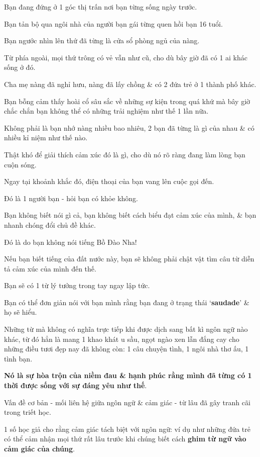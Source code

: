 \documentclass{article}
\begin{document}
%
Bạn đang đứng ở 1 góc thị trấn nơi bạn từng sống ngày trước.

Bạn tản bộ qua ngôi nhà của người bạn gái từng quen hồi bạn 16 tuổi.

Bạn ngước nhìn lên thứ đã từng là cửa sổ phòng ngủ của nàng.

Từ phía ngoài, mọi thứ trông có vẻ vẫn như cũ, cho dù bây giờ đã có 1 ai khác sống ở đó.

Cha mẹ nàng đã nghỉ hưu, nàng đã lấy chồng \& có 2 đứa trẻ ở 1 thành phố khác.

Bạn bỗng cảm thấy hoài cổ sâu sắc về những sự kiện trong quá khứ mà bây giờ chắc chắn bạn không thể có những trải nghiệm như thế 1 lần nữa.

Không phải là bạn nhớ nàng nhiều bao nhiêu, 2 bạn đã từng là gì của nhau \& có nhiều kỉ niệm như thế nào.

Thật khó để giải thích cảm xúc đó là gì, cho dù nó rõ ràng đang làm lòng bạn cuộn sóng.

Ngay tại khoảnh khắc đó, điện thoại của bạn vang lên cuộc gọi đến.

Đó là 1 người bạn - hỏi bạn có khỏe không.

Bạn không biết nói gì cả, bạn không biết cách biểu đạt cảm xúc của mình, \& bạn nhanh chóng đổi chủ đề khác.

%
Đó là do bạn không nói tiếng Bồ Đào Nha!

Nếu bạn biết tiếng của đất nước này, bạn sẽ không phải chật vật tìm câu từ diễn tả cảm xúc của mình đến thế.

Bạn sẽ có 1 từ lý tưởng trong tay ngay lập tức.

Bạn có thể đơn giản nói với bạn mình rằng bạn đang ở trạng thái `\textbf{saudade}' \& họ sẽ hiểu.

Những từ mà không có nghĩa trực tiếp khi được dịch sang bất kì ngôn ngữ nào khác, từ đó hẳn là mang 1 khao khát u sầu, ngọt ngào xen lẫn đắng cay cho những điều tươi đẹp nay đã không còn: 1 câu chuyện tình, 1 ngôi nhà thơ ấu, 1 tình bạn.

\textbf{Nó là sự hòa trộn của niềm đau \& hạnh phúc rằng mình đã từng có 1 thời được sống với sự đáng yêu như thế}.

%
Vấn đề cơ bản - mối liên hệ giữa ngôn ngữ \& cảm giác - từ lâu đã gây tranh cãi trong triết học.

1 số học giả cho rằng cảm giác tách biệt với ngôn ngữ: ví dụ như những đứa trẻ có thể cảm nhận mọi thứ rất lâu trước khi chúng biết cách \textbf{ghim từ ngữ vào cảm giác của chúng}.
\end{document}
